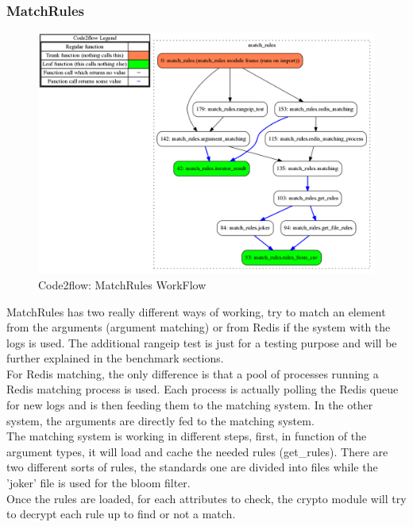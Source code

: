 \documentclass{eplmastersthesis}
\begin{document}
\subsubsection{MatchRules}
\begin{figure}[h!]
\begin{center}
	\includegraphics[scale=0.3]{res/flowMatchRules}
	\caption{Code2flow: MatchRules WorkFlow}
	\label{code2flow-matchRules}
\end{center}
\end{figure}

MatchRules has two really different ways of working, try to match an element from the arguments (argument matching) or from Redis if the system with the logs is used.
The additional rangeip test is just for a testing purpose and will be further explained in the benchmark sections.\\

For Redis matching, the only difference is that a pool of processes running a Redis matching process is used.
Each process is actually polling the Redis queue for new logs and is then feeding them to the matching system.
In the other system, the arguments are directly fed to the matching system.\\

The matching system is working in different steps, first, in function of the argument types, it will load and cache the needed rules (get\_rules).
There are two different sorts of rules, the standards one are divided into files while the 'joker' file is used for the bloom filter.\\

Once the rules are loaded, for each attributes to check, the crypto module will try to decrypt each rule up to find or not a match.
\end{document}
